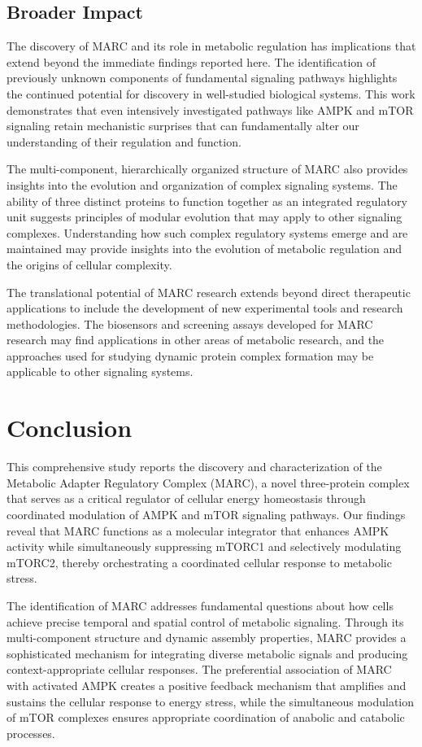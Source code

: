 \documentclass[11pt,a4paper]{article}
\begin{document}
\subsection{Broader Impact}

The discovery of MARC and its role in metabolic regulation has implications that extend beyond the immediate findings reported here. The identification of previously unknown components of fundamental signaling pathways highlights the continued potential for discovery in well-studied biological systems. This work demonstrates that even intensively investigated pathways like AMPK and mTOR signaling retain mechanistic surprises that can fundamentally alter our understanding of their regulation and function.

The multi-component, hierarchically organized structure of MARC also provides insights into the evolution and organization of complex signaling systems. The ability of three distinct proteins to function together as an integrated regulatory unit suggests principles of modular evolution that may apply to other signaling complexes. Understanding how such complex regulatory systems emerge and are maintained may provide insights into the evolution of metabolic regulation and the origins of cellular complexity.

The translational potential of MARC research extends beyond direct therapeutic applications to include the development of new experimental tools and research methodologies. The biosensors and screening assays developed for MARC research may find applications in other areas of metabolic research, and the approaches used for studying dynamic protein complex formation may be applicable to other signaling systems.

\section{Conclusion}
This comprehensive study reports the discovery and characterization of the Metabolic Adapter Regulatory Complex (MARC), a novel three-protein complex that serves as a critical regulator of cellular energy homeostasis through coordinated modulation of AMPK and mTOR signaling pathways. Our findings reveal that MARC functions as a molecular integrator that enhances AMPK activity while simultaneously suppressing mTORC1 and selectively modulating mTORC2, thereby orchestrating a coordinated cellular response to metabolic stress.

The identification of MARC addresses fundamental questions about how cells achieve precise temporal and spatial control of metabolic signaling. Through its multi-component structure and dynamic assembly properties, MARC provides a sophisticated mechanism for integrating diverse metabolic signals and producing context-appropriate cellular responses. The preferential association of MARC with activated AMPK creates a positive feedback mechanism that amplifies and sustains the cellular response to energy stress, while the simultaneous modulation of mTOR complexes ensures appropriate coordination of anabolic and catabolic processes.
\end{document}
